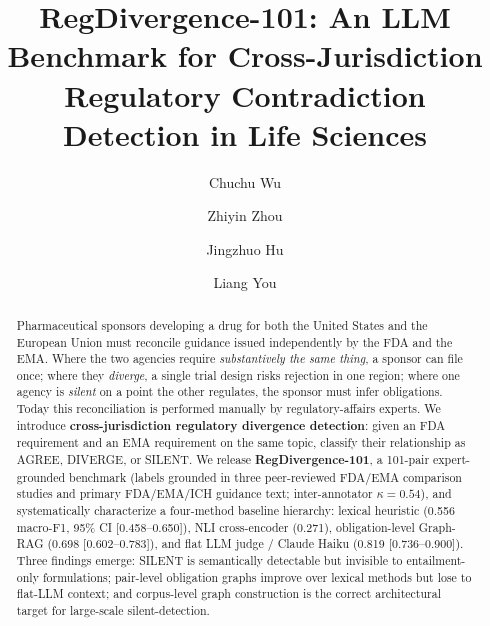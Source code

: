 \documentclass[sigconf]{acmart}
\begin{document}
\title[RegDivergence-101]{RegDivergence-101: An LLM Benchmark for
  Cross-Jurisdiction Regulatory Contradiction Detection in Life Sciences}

\author{Chuchu Wu}

\author{Zhiyin Zhou}

\author{Jingzhuo Hu}

\author{Liang You}

\renewcommand{\shortauthors}{Wu et al.}

\begin{abstract}
Pharmaceutical sponsors developing a drug for both the United States and the
European Union must reconcile guidance issued independently by the FDA and the
EMA. Where the two agencies require \textit{substantively the same thing}, a
sponsor can file once; where they \textit{diverge}, a single trial design risks
rejection in one region; where one agency is \textit{silent} on a point the
other regulates, the sponsor must infer obligations. Today this reconciliation
is performed manually by regulatory-affairs experts. We introduce
\textbf{cross-jurisdiction regulatory divergence detection}: given an FDA
requirement and an EMA requirement on the same topic, classify their
relationship as AGREE, DIVERGE, or SILENT. We release
\textbf{RegDivergence-101}, a 101-pair expert-grounded benchmark (labels
grounded in three peer-reviewed FDA/EMA comparison studies and primary
FDA/EMA/ICH guidance text; inter-annotator
$\kappa = 0.54$), and systematically
characterize a four-method baseline hierarchy: lexical heuristic (0.556
macro-F1, 95\% CI [0.458--0.650]), NLI cross-encoder (0.271),
obligation-level Graph-RAG (0.698 [0.602--0.783]), and flat LLM judge /
Claude Haiku (0.819 [0.736--0.900]). Three findings emerge: SILENT is
semantically detectable but invisible to entailment-only formulations;
pair-level obligation graphs improve over lexical methods but lose to flat-LLM
context; and corpus-level graph construction is the correct architectural
target for large-scale silent-detection.
\end{abstract}
\end{document}
